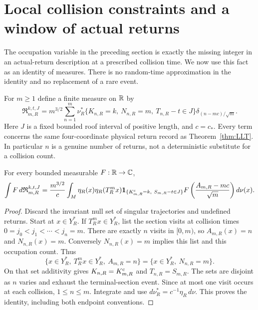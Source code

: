 \section{Local collision constraints and a window of actual returns}
\label{sec:v37-return-window}
The occupation variable in the preceding section is exactly the missing
integer in an actual-return description at a prescribed collision time.
We now use this fact as an identity of measures. There is no random-time
approximation in the identity and no replacement of a rare event.

For $m\ge1$ define a finite measure on $\mathbb R$ by
\begin{equation}\label{eq:v37-return-window-measure}
 \mathfrak R_{m,R}^{k,t,J}
 =m^{3/2}\sum_{n=1}^{m}
 \nu_R^*\{K_{n,R}=k,\ N_{n,R}=m,\ T_{n,R}-t\in J\}
                         \delta_{(n-mc)/\sqrt m}.
\end{equation}
Here $J$ is a fixed bounded roof interval of positive length, and
$c=c_*$. Every term concerns the same four-coordinate physical return
record as Theorem~\ref{thm:LLT}. In particular $n$ is a genuine number
of returns, not a deterministic substitute for a collision count.

\begin{proposition}
\label{prop:v37-exact-return-disintegration}
For every bounded measurable $F:\mathbb R\to\mathbb C$,
\begin{align}\label{eq:v37-exact-return-disintegration}
 \int F\,d\mathfrak R_{m,R}^{k,t,J}
 =\frac{m^{3/2}}c\int_M\eta_R(x)\eta_R(T_R^mx)
 \one_{\{K^{\rm c}_{m,R}=k,\ S_{m,R}-t\in J\}}
 F\left(\frac{A_{m,R}-mc}{\sqrt m}\right)d\nu(x).
\end{align}
\end{proposition}
\begin{proof}
Discard the invariant null set of singular trajectories and undefined
returns. Start at $x\in Y_R^*$. If $T_R^mx\in Y_R^*$, list the section
visits at collision times $0=j_0<j_1<\cdots<j_n=m$.
There are exactly $n$ visits in $[0,m)$, so $A_{m,R}(x)=n$ and
$N_{n,R}(x)=m$. Conversely $N_{n,R}(x)=m$ implies this list and this
occupation count. Thus
\[
 \{x\in Y_R^*,\ T_R^mx\in Y_R^*,\ A_{m,R}=n\}
       =\{x\in Y_R^*,\ N_{n,R}=m\}.
\]
On that set additivity gives $K_{n,R}=K^{\rm c}_{m,R}$ and
$T_{n,R}=S_{m,R}$. The sets are disjoint as $n$ varies and exhaust
the terminal-section event. Since at most one visit occurs at each
collision, $1\le n\le m$. Integrate and use
$d\nu_R^*=c^{-1}\eta_R\,d\nu$. This proves the identity, including
both endpoint conventions.
\end{proof}

